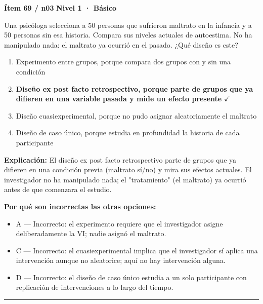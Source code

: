 \documentclass[12pt,a4paper]{article}
\begin{document}
\begin{mdframed}[backgroundcolor=fondogris,linecolor=azul,linewidth=1pt,innerleftmargin=10pt,innerrightmargin=10pt,innertopmargin=7pt,innerbottommargin=7pt]
\textbf{Ítem 69 / n03} \hfill {\small\bfseries\color{azul} Nivel 1 · Básico}
\end{mdframed}

Una psicóloga selecciona a 50 personas que sufrieron maltrato en la infancia y a 50 personas sin esa historia. Compara sus niveles actuales de autoestima. No ha manipulado nada: el maltrato ya ocurrió en el pasado. ¿Qué diseño es este?

\begin{enumerate}
  \item[A.] Experimento entre grupos, porque compara dos grupos con y sin una condición
  \item[\textbf{\color{verde}B.}] \textbf{\color{verde} Diseño ex post facto retrospectivo, porque parte de grupos que ya difieren en una variable pasada y mide un efecto presente} \hfill $\checkmark$
  \item[C.] Diseño cuasiexperimental, porque no pudo asignar aleatoriamente el maltrato
  \item[D.] Diseño de caso único, porque estudia en profundidad la historia de cada participante
\end{enumerate}

\noindent\textbf{\color{azul}Explicación:} El diseño ex post facto retrospectivo parte de grupos que ya difieren en una condición previa (maltrato sí/no) y mira sus efectos actuales. El investigador no ha manipulado nada; el "tratamiento" (el maltrato) ya ocurrió antes de que comenzara el estudio.

\noindent\textbf{\color{gris}Por qué son incorrectas las otras opciones:}
\begin{itemize}
  \item {\small A — Incorrecto: el experimento requiere que el investigador asigne deliberadamente la VI; nadie asignó el maltrato.}
  \item {\small C — Incorrecto: el cuasiexperimental implica que el investigador sí aplica una intervención aunque no aleatorice; aquí no hay intervención alguna.}
  \item {\small D — Incorrecto: el diseño de caso único estudia a un solo participante con replicación de intervenciones a lo largo del tiempo.}
\end{itemize}
\vspace{8pt}\hrule\vspace{10pt}
\end{document}
